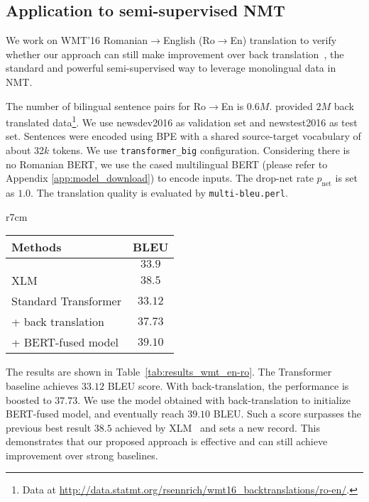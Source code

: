 \documentclass{article} \usepackage{iclr2020_conference,times}
\begin{document}
\subsection{Application to semi-supervised NMT}\label{sec:semisupervised_nmt}
We work on WMT'16 Romanian$\to$English (Ro$\to$En) translation to verify whether our approach can still make improvement over back translation~\citep{sennrich2016improving}, the standard and powerful semi-supervised way to leverage monolingual data in NMT.

The number of bilingual sentence pairs for Ro$\to$En is $0.6M$. \cite{sennrich2016edinburgh} provided $2M$ back translated data\footnote{Data at \url{http://data.statmt.org/rsennrich/wmt16_backtranslations/ro-en/}.}. We use newsdev2016 as validation set and newstest2016 as test set. Sentences were encoded using BPE with a shared source-target vocabulary of about 32$k$ tokens. We use \texttt{transformer\_big} configuration. Considering there is no Romanian BERT, we use the cased multilingual BERT (please refer to Appendix \ref{app:model_download}) to encode inputs. The drop-net rate $p_{\text{net}}$ is set as $1.0$. The translation quality is evaluated by  \texttt{multi-bleu.perl}.

\begin{wraptable}{r}{7cm}
\vspace{-0.8cm}
\centering
\caption{BLEU scores of WMT'16 Ro$\rightarrow$En.}
\begin{tabular}{lc}
\toprule
Methods& BLEU\\
\midrule
\citet{sennrich2016edinburgh}& $33.9$ \\
XLM~\citep{lample2019cross} & $38.5$ \\
\midrule
Standard Transformer & $33.12$  \\
+ back translation & $37.73$ \\
+ BERT-fused model & $39.10$ \\
\bottomrule
\end{tabular}
\label{tab:results_wmt_en-ro}
\vspace{-0.3cm}
\end{wraptable}


The results are shown in Table~\ref{tab:results_wmt_en-ro}. The Transformer baseline achieves $33.12$ BLEU score. With back-translation, the performance is boosted to $37.73$. We use the model obtained with back-translation to initialize BERT-fused model, and eventually reach $39.10$ BLEU. Such a score surpasses the previous best result $38.5$ achieved by XLM~\citep{lample2019cross} and sets a new record. This demonstrates that  our proposed approach is effective and can still achieve improvement over strong baselines.
\end{document}
